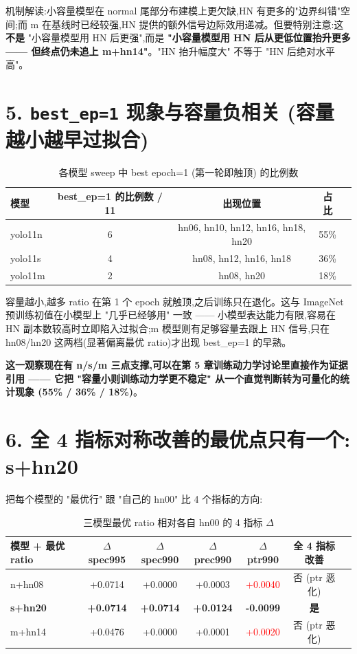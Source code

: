 \documentclass[UTF8,12pt,a4paper]{ctexart}
\begin{document}
机制解读:小容量模型在 normal 尾部分布建模上更欠缺,HN 有更多的"边界纠错"空间;而 m 在基线时已经较强,HN 提供的额外信号边际效用递减。但要特别注意:这\textbf{不是} "小容量模型用 HN 后更强",而是 \textbf{"小容量模型用 HN 后从更低位置抬升更多 —— 但终点仍未追上 m+hn14"}。"HN 抬升幅度大" 不等于 "HN 后绝对水平高"。

\bigskip
\section*{5. \texttt{best\_ep=1} 现象与容量负相关 \mdseries (容量越小越早过拟合)}

\begin{table}[h]
\centering
\caption{各模型 sweep 中 best epoch=1 (第一轮即触顶) 的比例数}
\begin{tabular}{lcccc}
\toprule
模型 & best\_ep=1 的比例数 / 11 & 出现位置 & 占比 \\
\midrule
yolo11n & 6 & hn06, hn10, hn12, hn16, hn18, hn20 & 55\% \\
yolo11s & 4 & hn08, hn12, hn16, hn18 & 36\% \\
yolo11m & 2 & hn08, hn20 & 18\% \\
\bottomrule
\end{tabular}
\end{table}

容量越小,越多 ratio 在第 1 个 epoch 就触顶,之后训练只在退化。这与 ImageNet 预训练初值在小模型上 "几乎已经够用" 一致 —— 小模型表达能力有限,容易在 HN 副本数较高时立即陷入过拟合;m 模型则有足够容量去跟上 HN 信号,只在 hn08/hn20 这两档(显著偏离最优 ratio)才出现 best\_ep=1 的早熟。

\textbf{这一观察现在有 n/s/m 三点支撑,可以在第 5 章训练动力学讨论里直接作为证据引用 —— 它把 "容量小则训练动力学更不稳定" 从一个直觉判断转为可量化的统计现象 (55\% / 36\% / 18\%)}。

\bigskip
\section*{6. 全 4 指标对称改善的最优点只有一个: s+hn20}

把每个模型的 "最优行" 跟 "自己的 hn00" 比 4 个指标的方向:

\begin{table}[h]
\centering
\caption{三模型最优 ratio 相对各自 hn00 的 4 指标 \(\Delta\)}
\begin{tabular}{lcccccc}
\toprule
模型 + 最优 ratio & \(\Delta\)spec995 & \(\Delta\)spec990 & \(\Delta\)prec990 & \(\Delta\)ptr990 & 全 4 指标改善 \\
\midrule
n+hn08 & +0.0714 & +0.0000 & +0.0003 & \textcolor{red}{+0.0040} & 否 (ptr 恶化) \\
\textbf{s+hn20} & \textbf{+0.0714} & \textbf{+0.0714} & \textbf{+0.0124} & \textbf{-0.0099} & \textbf{是} \\
m+hn14 & +0.0476 & +0.0000 & +0.0001 & \textcolor{red}{+0.0020} & 否 (ptr 恶化) \\
\bottomrule
\end{tabular}
\end{table}
\end{document}
